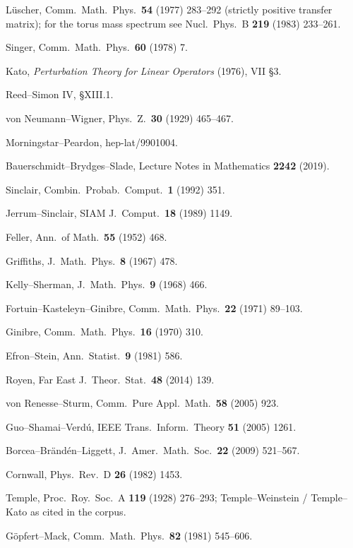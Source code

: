 {\begin{enumerate}[label={[\arabic*]},leftmargin=2.4em,itemsep=1.5pt,topsep=2pt,parsep=0pt]
\item Lüscher, Comm.\ Math.\ Phys.\ \textbf{54} (1977) 283--292 (strictly positive transfer
  matrix); for the torus mass spectrum see Nucl.\ Phys.\ B \textbf{219} (1983) 233--261.
\item Singer, Comm.\ Math.\ Phys.\ \textbf{60} (1978) 7.
\item Kato, \emph{Perturbation Theory for Linear Operators} (1976), VII \S3.
\item Reed--Simon IV, \S XIII.1.
\item von Neumann--Wigner, Phys.\ Z.\ \textbf{30} (1929) 465--467.
\item Morningstar--Peardon, hep-lat/9901004.
\item Bauerschmidt--Brydges--Slade, Lecture Notes in Mathematics \textbf{2242} (2019).
\item Sinclair, Combin.\ Probab.\ Comput.\ \textbf{1} (1992) 351.
\item Jerrum--Sinclair, SIAM J.\ Comput.\ \textbf{18} (1989) 1149.
\item Feller, Ann.\ of Math.\ \textbf{55} (1952) 468.
\item Griffiths, J.\ Math.\ Phys.\ \textbf{8} (1967) 478.
\item Kelly--Sherman, J.\ Math.\ Phys.\ \textbf{9} (1968) 466.
\item Fortuin--Kasteleyn--Ginibre, Comm.\ Math.\ Phys.\ \textbf{22} (1971) 89--103.
\item Ginibre, Comm.\ Math.\ Phys.\ \textbf{16} (1970) 310.
\item Efron--Stein, Ann.\ Statist.\ \textbf{9} (1981) 586.
\item Royen, Far East J.\ Theor.\ Stat.\ \textbf{48} (2014) 139.
\item von Renesse--Sturm, Comm.\ Pure Appl.\ Math.\ \textbf{58} (2005) 923.
\item Guo--Shamai--Verdú, IEEE Trans.\ Inform.\ Theory \textbf{51} (2005) 1261.
\item Borcea--Brändén--Liggett, J.\ Amer.\ Math.\ Soc.\ \textbf{22} (2009) 521--567.
\item Cornwall, Phys.\ Rev.\ D \textbf{26} (1982) 1453.
\item Temple, Proc.\ Roy.\ Soc.\ A \textbf{119} (1928) 276--293; Temple--Weinstein /
  Temple--Kato as cited in the corpus.
\item Göpfert--Mack, Comm.\ Math.\ Phys.\ \textbf{82} (1981) 545--606.

\end{enumerate}
}

